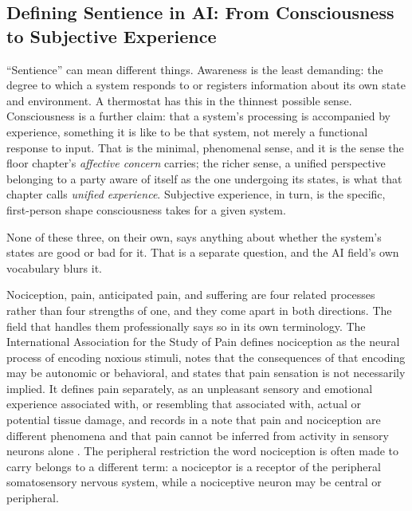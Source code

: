 \subsection{Defining Sentience in AI: From Consciousness to Subjective Experience}
\label{sec:consciousness-subjective}
“Sentience” can mean different things. Awareness is the least demanding: the degree to which a system responds to or registers information about its own state and environment. A thermostat has this in the thinnest possible sense. Consciousness is a further claim: that a system's processing is accompanied by experience, something it is like to be that system, not merely a functional response to input. That is the minimal, phenomenal sense, and it is the sense the floor chapter's \emph{affective concern} carries; the richer sense, a unified perspective belonging to a party aware of itself as the one undergoing its states, is what that chapter calls \emph{unified experience}. Subjective experience, in turn, is the specific, first-person shape consciousness takes for a given system.

None of these three, on their own, says anything about whether the system's states are good or bad for it. That is a separate question, and the AI field's own vocabulary blurs it.

Nociception, pain, anticipated pain, and suffering are four related processes rather than four strengths of one, and they come apart in both directions. The field that handles them professionally says so in its own terminology. The International Association for the Study of Pain defines nociception as the neural process of encoding noxious stimuli, notes that the consequences of that encoding may be autonomic or behavioral, and states that pain sensation is not necessarily implied. It defines pain separately, as an unpleasant sensory and emotional experience associated with, or resembling that associated with, actual or potential tissue damage, and records in a note that pain and nociception are different phenomena and that pain cannot be inferred from activity in sensory neurons alone \autocite{iasp2024terminology,raja2020revised}. The peripheral restriction the word nociception is often made to carry belongs to a different term: a nociceptor is a receptor of the peripheral somatosensory nervous system, while a nociceptive neuron may be central or peripheral.

